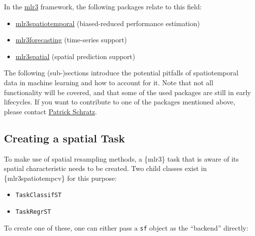 \documentclass[
]{scrbook}
\newenvironment{Shaded}{\begin{snugshade}}{\end{snugshade}}
\newcommand{\AttributeTok}[1]{\textcolor[rgb]{0.77,0.63,0.00}{#1}}
\newcommand{\CommentTok}[1]{\textcolor[rgb]{0.56,0.35,0.01}{\textit{#1}}}
\newcommand{\DecValTok}[1]{\textcolor[rgb]{0.00,0.00,0.81}{#1}}
\newcommand{\FunctionTok}[1]{\textcolor[rgb]{0.00,0.00,0.00}{#1}}
\newcommand{\NormalTok}[1]{#1}
\newcommand{\OtherTok}[1]{\textcolor[rgb]{0.56,0.35,0.01}{#1}}
\newcommand{\SpecialCharTok}[1]{\textcolor[rgb]{0.00,0.00,0.00}{#1}}
\newcommand{\StringTok}[1]{\textcolor[rgb]{0.31,0.60,0.02}{#1}}
\providecommand{\tightlist}{%
  \setlength{\itemsep}{0pt}\setlength{\parskip}{0pt}}
\renewenvironment{Shaded} {\begin{snugshade}\small} {\end{snugshade}}
\begin{document}
In the \href{https://cran.r-project.org/package=mlr3}{mlr3} framework, the following packages relate to this field:

\begin{itemize}
\tightlist
\item
  \href{https://github.com/mlr-org/mlr3spatiotemporal}{mlr3spatiotemporal} (biased-reduced performance estimation)
\item
  \href{https://github.com/mlr-org/mlr3forecasting}{mlr3forecasting} (time-series support)
\item
  \href{https://github.com/mlr-org/mlr3spatial}{mlr3spatial} (spatial prediction support)
\end{itemize}

The following (sub-)sections introduce the potential pitfalls of spatiotemporal data in machine learning and how to account for it.
Note that not all functionality will be covered, and that some of the used packages are still in early lifecycles.
If you want to contribute to one of the packages mentioned above, please contact \href{https://github.com/pat-s}{Patrick Schratz}.

\hypertarget{creating-a-spatial-task}{%
\subsection{Creating a spatial Task}\label{creating-a-spatial-task}}

To make use of spatial resampling methods, a \{mlr3\} task that is aware of its spatial characteristic needs to be created.
Two child classes exist in \{mlr3spatiotempcv\} for this purpose:

\begin{itemize}
\tightlist
\item
  \texttt{TaskClassifST}
\item
  \texttt{TaskRegrST}
\end{itemize}

To create one of these, one can either pass a \texttt{sf} object as the ``backend'' directly:

\begin{Shaded}
\end{Shaded}
\end{document}
